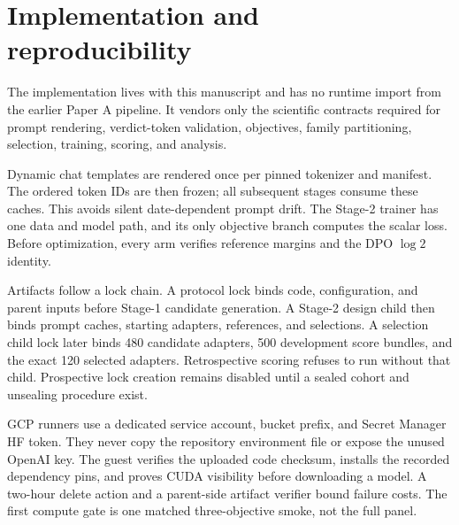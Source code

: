 \section{Implementation and reproducibility}

The implementation lives with this manuscript and has no runtime import from the
earlier Paper A pipeline. It vendors only the scientific contracts required for
prompt rendering, verdict-token validation, objectives, family partitioning,
selection, training, scoring, and analysis.

Dynamic chat templates are rendered once per pinned tokenizer and manifest. The
ordered token IDs are then frozen; all subsequent stages consume these caches.
This avoids silent date-dependent prompt drift. The Stage-2 trainer has one data
and model path, and its only objective branch computes the scalar loss. Before
optimization, every arm verifies reference margins and the DPO $\log2$ identity.

Artifacts follow a lock chain. A protocol lock binds code, configuration, and
parent inputs before Stage-1 candidate generation. A Stage-2 design child then
binds prompt caches, starting adapters, references, and selections. A selection
child lock later binds 480 candidate adapters, 500 development score bundles,
and the exact 120 selected adapters. Retrospective scoring refuses to run without
that child. Prospective lock creation remains disabled until a sealed cohort and
unsealing procedure exist.

GCP runners use a dedicated service account, bucket prefix, and Secret Manager
HF token. They never copy the repository environment file or expose the unused
OpenAI key. The guest verifies the uploaded code checksum, installs the recorded
dependency pins, and proves CUDA visibility before downloading a model. A
two-hour delete action and a parent-side artifact verifier bound failure costs.
The first compute gate is one matched three-objective smoke, not the full panel.
